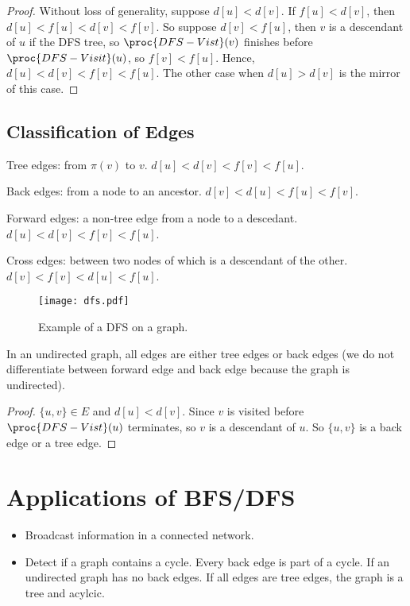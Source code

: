\begin{proof}
    Without loss of generality, suppose $d[u] < d[v]$. If $f[u] < d[v]$, then $d[u] < f[u] < d[v] < f[v]$. So suppose $d[v] < f[u]$, then $v$ is a descendant of $u$ if the DFS tree, so $\proc{DFS-Vist}(v)$ finishes before $\proc{DFS-Visit}(u)$, so $f[v] < f[u]$. Hence, $d[u] < d[v] < f[v] < f[u]$. The other case when $d[u] > d[v]$ is the mirror of this case.
\end{proof}

\subsection{Classification of Edges}

Tree edges: from $\pi(v)$ to $v$. $d[u] < d[v] < f[v] < f[u]$.

Back edges: from a node to an ancestor. $d[v] < d[u] < f[u] < f[v]$.

Forward edges: a non-tree edge from a node to a descedant. $d[u] < d[v] < f[v] < f[u]$.

Cross edges: between two nodes of which is a descendant of the other. $d[v] < f[v] < d[u] < f[u]$.

\begin{figure}[htbp]
    \centering
    \texttt{[image: dfs.pdf]}

    \hfill

    \caption{Example of a DFS on a graph.}
    \label{fig:dfs-edges}
\end{figure}


\begin{theorem}
    In an undirected graph, all edges are either tree edges or back edges (we do not differentiate between forward edge and back edge because the graph is undirected).
\end{theorem}

\begin{proof}
    $\{u,v\} \in E$ and $d[u] < d[v]$. Since $v$ is visited before $\proc{DFS-Vist}(u)$ terminates, so $v$ is a descendant of $u$. So $\{u,v\}$ is a back edge or a tree edge.
\end{proof}

\section{Applications of BFS/DFS}

\begin{itemize}
    \item Broadcast information in a connected network.
    \item Detect if a graph contains a cycle. Every back edge is part of a cycle. If an undirected graph has no back edges. If all edges are tree edges, the graph is a tree and acylcic. 
\end{itemize}

